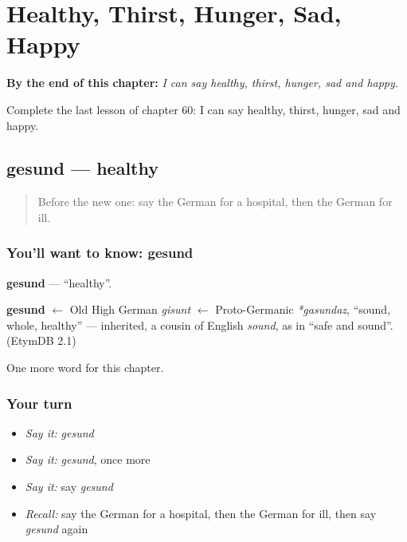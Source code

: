 
\chapter{Healthy, Thirst, Hunger, Sad, Happy}
\label{ch:ge-healthy-thirst-hunger-sad-happy}

\begin{chapteropening}
\textbf{By the end of this chapter:} \emph{I can say healthy, thirst, hunger, sad and happy.}

Complete the last lesson of chapter 60: I can say healthy, thirst, hunger, sad and happy.
\end{chapteropening}

\section[gesund]{gesund — healthy}

\label{lesson:GE-C60-gesund}



\begin{quote}
Before the new one: say the German for a hospital, then the German for ill.
\end{quote}

\subsection*{You'll want to know: gesund}
\textbf{gesund} — \textquotedblleft{}healthy\textquotedblright{}.

\begin{cousinweb}
\textbf{gesund} $\leftarrow$ Old High German \emph{gisunt} $\leftarrow$ Proto-Germanic \emph{*gasundaz}, \textquotedblleft{}sound, whole, healthy\textquotedblright{} — inherited, a cousin of English \emph{sound}, as in \textquotedblleft{}safe and sound\textquotedblright{}. (EtymDB 2.1)
\end{cousinweb}

\begin{grammarlens}[title={What you've built}]
One more word for this chapter.
\end{grammarlens}

\subsection*{Your turn}
\begin{itemize}
\raggedright
  \item \emph{Say it:} \emph{gesund}
  \item \emph{Say it:} \emph{gesund}, once more
  \item \emph{Say it:} say \emph{gesund}
  \item \emph{Recall:} say the German for a hospital, then the German for ill, then say \emph{gesund} again
\end{itemize}

